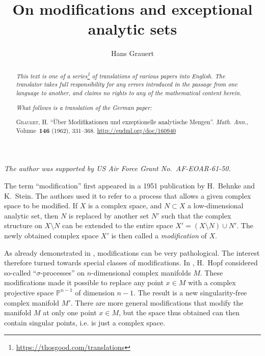 \documentclass{article}
\title{On modifications and exceptional analytic sets}
\author{Hans Grauert}
\date{}
\newcommand{\doctype}{German paper}
\newcommand{\origcit}{%
  \textsc{Grauert, H.}
  ``\"{U}ber Modifikationen und exzeptionelle analytische Mengen''.
  \emph{Math. Ann.}, Volume~\textbf{146} (1962), 331--368.
  {\url{http://eudml.org/doc/160940}}%
}
\theoremstyle{plain}
\newcommand{\PP}{\mathbb{P}}
\newcommand{\oldpage}[1]{\marginpar{\footnotesize$\Big\vert$ \textit{p.~#1}}}
\begin{document}
\maketitle
\thispagestyle{fancy}

\renewcommand{\abstractname}{Translator's note.}

\begin{abstract}
  \renewcommand*{\thefootnote}{\fnsymbol{footnote}}
  \emph{This text is one of a series\footnote{\url{https://thosgood.com/translations}} of translations of various papers into English.}
  \emph{The translator takes full responsibility for any errors introduced in the passage from one language to another, and claims no rights to any of the mathematical content herein.}

  \medskip

  \emph{What follows is a translation of the \doctype:}

  \medskip\noindent
  \origcit
\end{abstract}

\setcounter{footnote}{0}

\setcounter{tocdepth}{1}
\tableofcontents



\subsubsection*{}

\emph{The author was supported by US Air Force Grant No.~AF-EOAR-61-50.}

\bigskip

\oldpage{331}
The term ``modification'' first appeared in a 1951 publication \cite{1} by H.~Behnke and K.~Stein.
The authors used it to refer to a process that allows a given complex space to be modified.
If $X$ is a complex space, and $N\subset X$ a low-dimensional analytic set, then $N$ is replaced by another set $N'$ such that the complex structure on $X\setminus N$ can be extended to the entire space $X'=(X\setminus N)\cup N'$.
The newly obtained complex space $X'$ is then called a \emph{modification} of $X$.

As already demonstrated in \cite{1}, modifications can be very pathological.
The interest therefore turned towards special classes of modifications.
In \cite{12}, H.~Hopf considered so-called ``$\sigma$-processes'' on $n$-dimensional complex manifolds $M$.
These modifications made it possible to replace any point $x\in M$ with a complex projective space $\PP^{n-1}$ of dimension $n-1$.
The result is a new singularity-free complex manifold $M'$.
There are more general modifications that modify the manifold $M$ at only one point $x\in M$, but the space thus obtained can then contain singular points, i.e. is just a complex space.
\end{document}

